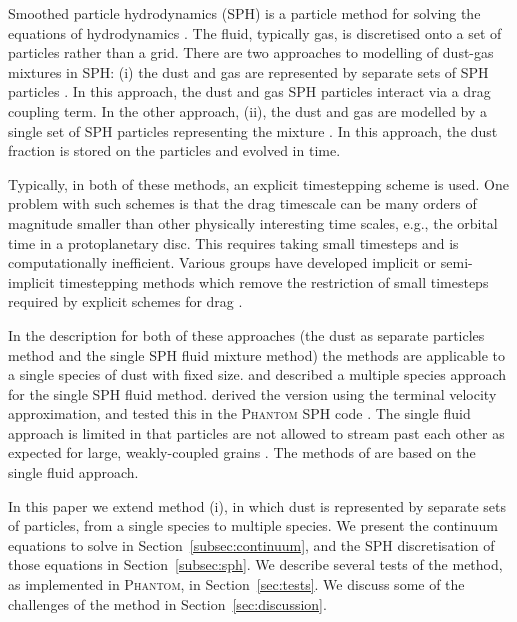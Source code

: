 \documentclass[fleqn,usenatbib]{mnras}
\begin{document}
Smoothed particle hydrodynamics (SPH) is a particle method for solving the
equations of hydrodynamics \citep{Monaghan1992ARA&A..30..543M,
Monaghan2005RPPh...68.1703M, Price2012JCoPh.231..759P}. The fluid, typically
gas, is discretised onto a set of particles rather than a grid. There are two
approaches to modelling of dust-gas mixtures in SPH: (i) the dust and gas are
represented by separate sets of SPH particles
\citep{Monaghan1995CoPhC..87..225M, Laibe2012MNRAS.420.2345L,
Laibe2012MNRAS.420.2365L}. In this approach, the dust and gas SPH particles
interact via a drag coupling term. In the other approach, (ii), the dust and gas
are modelled by a single set of SPH particles representing the mixture
\citep{Laibe2014MNRAS.444.1940L, Laibe2014MNRAS.440.2147L,
Laibe2014MNRAS.440.2136L, Price2015MNRAS.451..813P,
Ballabio2018MNRAS.477.2766B}. In this approach, the dust fraction is stored on
the particles and evolved in time.

Typically, in both of these methods, an explicit timestepping scheme is used.
One problem with such schemes is that the drag timescale can be many orders of
magnitude smaller than other physically interesting time scales, e.g., the
orbital time in a protoplanetary disc. This requires taking small timesteps and
is computationally inefficient. Various groups have developed implicit or
semi-implicit timestepping methods which remove the restriction of small
timesteps required by explicit schemes for drag
\citep{Monaghan1997JCoPh.138..801M, Laibe2012MNRAS.420.2365L,
Loren-Aguilar2014MNRAS.443..927L, Loren-Aguilar2015MNRAS.454.4114L,
Stoyanovskaya2018A&C....25...25S}.

In the description for both of these approaches (the dust as separate particles
method and the single SPH fluid mixture method) the methods are applicable to a
single species of dust with fixed size. \citet{Laibe2014MNRAS.444.1940L} and
\citet{Hutchison2018MNRAS.476.2186H} described a multiple species approach for
the single SPH fluid method. \citet{Hutchison2018MNRAS.476.2186H} derived the
version using the terminal velocity approximation, and tested this in the
\textsc{Phantom} SPH code \citep{Price2018PASA...35...31P}. The single fluid
approach is limited in that particles are not allowed to stream past each other
as expected for large, weakly-coupled grains \citep{Laibe2014MNRAS.440.2147L}.
The methods of \citet{Benitez-Llambay2019ApJS..241...25B,
Lebreuilly2019A&A...626A..96L, Li2019ApJ...878...39L} are based on the single
fluid approach.

In this paper we extend method (i), in which dust is represented by separate
sets of particles, from a single species to multiple species. We present the
continuum equations to solve in Section~\ref{subsec:continuum}, and the SPH
discretisation of those equations in Section~\ref{subsec:sph}. We describe
several tests of the method, as implemented in \textsc{Phantom}, in
Section~\ref{sec:tests}. We discuss some of the challenges of the method in
Section~\ref{sec:discussion}.
\end{document}
